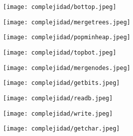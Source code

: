 \documentclass[12 pt]{report}
\begin{document}
\begin{figure}[h!]
  \centering
  \texttt{[image: complejidad/bottop.jpeg]}
  \caption{\label{fig:Hacer bottom top al montículo} }
\end{figure}

\begin{figure}[h!]
  \centering
  \texttt{[image: complejidad/mergetrees.jpeg]}
  \caption{\label{fig:Unir todos los arboles en uno principal} }
\end{figure}

\begin{figure}[h!]
  \centering
  \texttt{[image: complejidad/popminheap.jpeg]}
  \caption{\label{fig:Eliminar y devolver el menor elemento de la cola} }
\end{figure}
\newpage
\begin{figure}[h!]
  \centering
  \texttt{[image: complejidad/topbot.jpeg]}
  \caption{\label{fig:Hacer top bottom al montículo} }
\end{figure}

\begin{figure}[h!]
  \centering
  \texttt{[image: complejidad/mergenodes.jpeg]}
  \caption{\label{fig:Unir dos nodos a un ancestro comun} }
\end{figure}
\newpage
\begin{figure}[h!]
  \centering
  \texttt{[image: complejidad/getbits.jpeg]}
  \caption{\label{fig:Obtener la codificación correspondiente} }
\end{figure}


\begin{figure}[h!]
  \centering
  \texttt{[image: complejidad/readb.jpeg]}
  \caption{\label{fig:Leer el achivo comprimido} }
\end{figure}
\newpage
\begin{figure}[h!]
  \centering
  \texttt{[image: complejidad/write.jpeg]}
  \caption{\label{fig:Escribir el archivo original decodificando} }
\end{figure}

\begin{figure}[h!]
  \centering
  \texttt{[image: complejidad/getchar.jpeg]}
  \caption{\label{fig:Obtener el byte decodificado dada una cadena de bits} }
\end{figure}

\newpage
\end{document}
